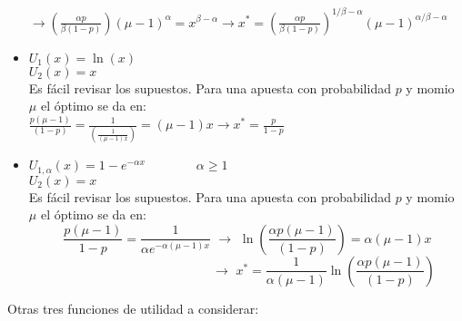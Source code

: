 \begin{itemize}
 $\rightarrow{\displaystyle\left(\frac{\alpha p}{\beta(1-p)}\right)(\mu-1)^{\alpha}=x^{\beta-\alpha}\rightarrow x^*=\left(\frac{\alpha p}{\beta(1-p)}\right)^{1/\beta-\alpha}(\mu-1)^{\alpha/\beta-\alpha}}$
 
 \item $U_1(x)=\ln (x)$\\
 $U_2(x)=x$\\
 
 Es fácil revisar los supuestos. Para una apuesta con probabilidad $p$ y momio $\mu$ el óptimo se da en:\\
 
 ${\displaystyle \frac{p(\mu-1)}{(1-p)}=\frac{1}{(\frac{1}{(\mu-1) x})}=(\mu-1)x\rightarrow x^*=\frac{p}{1-p}}$\\
 
 \item $U_{1,\alpha}(x)=1-e^{-\alpha x}\qquad\qquad \alpha \ge 1$\\
 $U_2(x)=x$\\
 
 Es fácil revisar los supuestos. Para una apuesta con probabilidad $p$ y momio $\mu$ el óptimo se da en:\\
 
\[{\displaystyle\frac{p(\mu-1)}{1-p}=\frac{1}{\alpha e^{-\alpha(\mu-1)x}}\,\,\rightarrow \,\,\ln \left(\frac{\alpha p(\mu-1)}{(1-p)}\right)=\alpha(\mu-1)x}\]
\[\qquad\qquad\qquad\qquad\qquad\qquad\rightarrow\,\, x^*={\displaystyle\frac{1}{\alpha (\mu-1)}\ln \left(\frac{\alpha p(\mu-1)}{(1-p)}\right)}\]
\end{itemize}

Otras tres funciones de utilidad a considerar:

